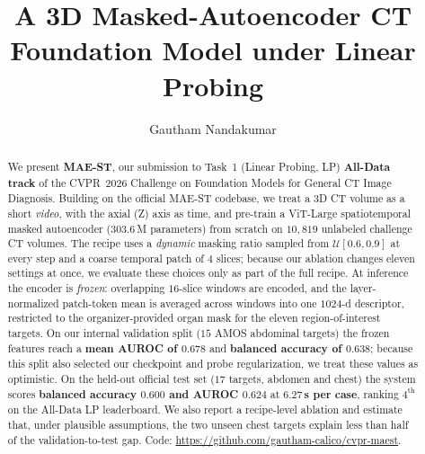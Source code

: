 \documentclass[runningheads]{llncs}
\begin{document}
\title{A 3D Masked-Autoencoder CT Foundation Model under Linear Probing}

\author{Gautham Nandakumar}

\maketitle

\begin{abstract}
We present \textbf{MAE-ST}, our submission to Task~1 (Linear Probing, LP)
\textbf{All-Data track} of the CVPR~2026 Challenge on Foundation Models for
General CT Image Diagnosis. Building on the official MAE-ST codebase, we treat a
3D CT volume as a short \emph{video}, with the axial (Z) axis as time, and
pre-train a ViT-Large spatiotemporal masked autoencoder ($303.6$\,M parameters)
from scratch on $10{,}819$ unlabeled challenge CT volumes. The recipe uses a
\emph{dynamic} masking ratio sampled from $\mathcal{U}[0.6,0.9]$ at every step
and a coarse temporal patch of $4$ slices; because our ablation changes eleven
settings at once, we evaluate these choices only as part of the full recipe. At
inference the encoder is \emph{frozen}: overlapping $16$-slice windows are
encoded, and the layer-normalized patch-token mean is averaged across windows
into one $1024$-d descriptor, restricted to the organizer-provided organ mask for
the eleven region-of-interest targets. On our internal validation split ($15$
AMOS abdominal targets) the frozen features reach a \textbf{mean AUROC of
$0.678$} and \textbf{balanced accuracy of $0.638$}; because this split also
selected our checkpoint and probe regularization, we treat these values as
optimistic. On the held-out official test set ($17$ targets, abdomen and chest)
the system scores \textbf{balanced accuracy $0.600$ and AUROC $0.624$} at
\textbf{$6.27$\,s per case}, ranking $4^{\text{th}}$ on the All-Data LP
leaderboard. We also report a recipe-level ablation and estimate that, under plausible
assumptions, the two unseen chest targets explain less than half of the
validation-to-test gap. Code:
\url{https://github.com/gautham-calico/cvpr-maest}. \\[4pt]
\end{abstract}
\end{document}
